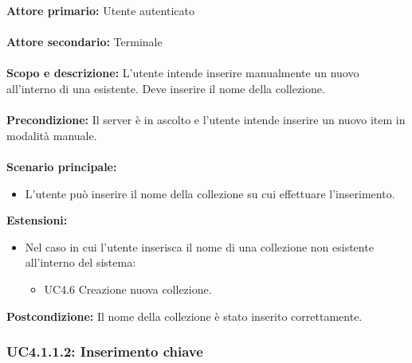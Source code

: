 \documentclass{scalatekids-article}
\begin{document}
\textbf{Attore primario:} Utente autenticato\\ \\
\textbf{Attore secondario:} Terminale\\ \\
\textbf{Scopo e descrizione:} L'utente intende inserire manualmente un nuovo  all'interno di una  esistente. Deve inserire il nome della collezione.\\ \\
\textbf{Precondizione:} Il server è in ascolto e l'utente intende inserire un nuovo item in modalità manuale.\\ \\
\textbf{Scenario principale:}
\begin{itemize}
\item L'utente può inserire il nome della collezione su cui effettuare l'inserimento.
\end{itemize}
\textbf{Estensioni:}
\begin{itemize}
\item Nel caso in cui l'utente inserisca il nome di una collezione non esistente all'interno del sistema:
  \begin{itemize}
  \item UC4.6 Creazione nuova collezione.
  \end{itemize}
\end{itemize}
\textbf{Postcondizione:} Il nome della collezione è stato inserito correttamente.

\subsubsection{UC4.1.1.2: Inserimento chiave}
\end{document}
